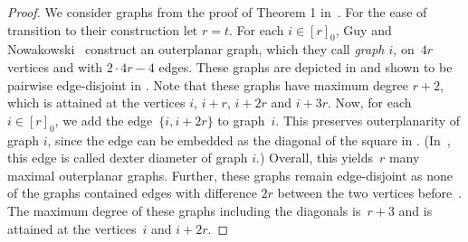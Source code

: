 \documentclass[unicode,runningheads,envcountsame,a4paper,dvipsnames,12pt]{llncs}
\begin{document}
	\begin{proof}
		We consider graphs from the proof of Theorem 1 in~\cite{Guy1990}. For the ease of transition to their construction let \(r=t\). For each \(i \in [r]_0\), Guy and Nowakowski~\cite{Guy1990} construct an outerplanar graph, which they call \emph{graph $i$}, on~\(4r\) vertices and with \(2 \cdot 4r - 4\) edges. These graphs are depicted in  and shown to be pairwise edge-disjoint in \cite{Guy1990}. Note that these graphs have maximum degree \(r+2\), which is attained at the vertices \(i\), \(i+r\), \(i+2r\) and \(i+3r\). Now, for each~\(i \in [r]_0\), we add the edge~\(\{i,i+2r\}\) to graph~\(i\). This preserves outerplanarity of graph \(i\), since the edge can be embedded as the diagonal of the square in . (In~\cite{Guy1990}, this edge is called dexter diameter of graph \(i\).) Overall, this yields~\(r\) many maximal outerplanar graphs. Further, these graphs remain edge-disjoint as none of the graphs contained edges with difference \(2r\) between the two vertices before~\cite{Guy1990}. The maximum degree of these graphs including the diagonals is~\(r+3\) and is attained at the vertices~\(i\) and \(i+2r\).
	\end{proof}
	
\end{document}
